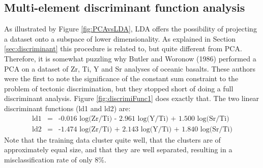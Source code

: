 \documentclass{article}
\begin{document}
\subsection{Multi-element discriminant function analysis}\label{sec:firstTypeB}

As   illustrated  by   Figure  \ref{fig:PCAvsLDA},   LDA   offers  the
possibility  of  projecting  a   dataset  onto  a  subspace  of  lower
dimensionality.  As  explained in Section  \ref{sec:discriminant} this
procedure is related  to, but quite different from  PCA. Therefore, it
is somewhat puzzling why Butler  and Woronow (1986) performed a PCA on
a dataset  of Zr,  Ti, Y  and Sr analyses  of oceanic  basalts.  These
authors were  the first to note  the significance of  the constant sum
constraint to the problem of tectonic discrimination, but they stopped
short    of   doing    a   full    discriminant    analysis.    Figure
\ref{fig:discrimiFunc1} does exactly that. The two linear discriminant
functions (ld1 and ld2) are:
\begin{eqnarray}
\nonumber \mbox{ld1} & = &
\mbox{-0.016 log(Zr/Ti) - 2.961 log(Y/Ti) + 1.500 log(Sr/Ti)}\\
\mbox{ld2} & = &
\mbox{-1.474 log(Zr/Ti) + 2.143 log(Y/Ti) + 1.840 log(Sr/Ti)}
\label{eq:ld_a}
\end{eqnarray}
Note that the training data  cluster quite well, that the clusters are
of  approximately  equal  size,  and  that they  are  well  separated,
resulting in a misclassification rate of only 8\%.\\
\end{document}
